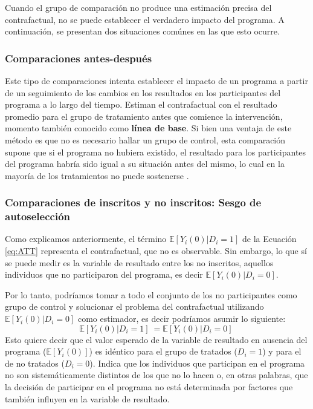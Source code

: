 \documentclass[../../main.tex]{subfiles}
\begin{document}
Cuando el grupo de comparación no produce una estimación precisa del contrafactual, no se
puede establecer el verdadero impacto del programa. A continuación, se presentan dos
situaciones comúnes en las que esto ocurre.

\subsubsection{Comparaciones antes-después}
Este tipo de comparaciones intenta establecer el impacto de un programa a partir de un
seguimiento de los cambios en los resultados en los participantes del programa a lo largo
del tiempo. Estiman el contrafactual con el resultado promedio para el grupo de
tratamiento antes que comience la intervención, momento también conocido como
\textbf{línea de base}. Si bien una ventaja de este método es que no es necesario hallar
un grupo de control, esta comparación supone que si el programa no hubiera existido,
el resultado para los participantes del programa habría sido igual a su situación antes
del mismo, lo cual en la mayoría de los tratamientos no puede sostenerse
\cite{gertler-2016}.

\subsubsection{Comparaciones de inscritos y no inscritos: Sesgo de autoselección}
Como explicamos anteriormente, el término \(\mathbb{E} \left[Y_i(0)|D_i=1\right]\) de la
Ecuación \ref{eq:ATT} representa el contrafactual, que no es observable. Sin embargo, lo
que sí se puede medir es la variable de resultado entre los no inscritos, aquellos
individuos que no participaron del programa, es decir \(\mathbb{E}
\left[Y_i(0)|D_i=0\right]\).

Por lo tanto, podríamos tomar a todo el conjunto de los no participantes como grupo de
control y solucionar el problema del contrafactual utilizando \(\mathbb{E}
\left[Y_i(0)|D_i=0\right]\) como estimador, es decir podríamos asumir lo siguiente:
\begin{equation}
    \mathbb{E} \left[Y_i(0)|D_i=1\right]\ = \mathbb{E} \left[Y_i(0)|D_i=0\right]\
    \label{eq:supuesto-1}  %
\end{equation}
Esto quiere decir que el valor esperado de la variable de resultado en ausencia del
programa (\(\mathbb{E}\left[Y_i(0)\right]\)) es idéntico para el grupo de tratados (\(D_i =
1\)) y para el de no tratados (\(D_i = 0\)). Indica que los individuos que participan en el
programa no son sistemáticamente distintos de los que no lo hacen \cite{bernal} o, en
otras palabras, que la decisión de participar en el programa no está determinada por
factores que también influyen en la variable de resultado.
\end{document}
